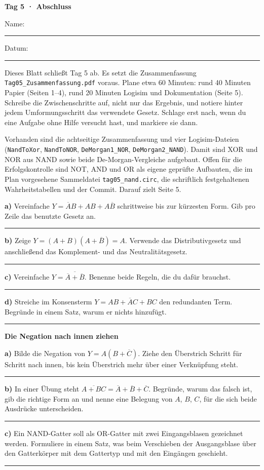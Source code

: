 \documentclass[10pt,a4paper]{article}
\newcommand{\titlepagepart}[2]{\vspace*{-4mm}{\sffamily\small #1}\par{\sffamily\LARGE\bfseries #2}\par\vspace{2mm}}
\newcommand{\block}[1]{\par\vspace{2mm}{\sffamily\large\bfseries #1}\par}
\newcommand{\code}[1]{\texttt{#1}}
\newcommand{\antwort}[1]{\par\vspace{#1}\hrule\vspace{3mm}}
\begin{document}
\titlepagepart{01 / BOOLESCHE ALGEBRA · CA. 12 MINUTEN}{Tag 5 · Abschluss}
Name: \rule{65mm}{0.3pt}\hfill Datum: \rule{30mm}{0.3pt}

Dieses Blatt schließt Tag 5 ab. Es setzt die Zusammenfassung
\code{Tag05\_Zusammenfassung.pdf} voraus. Plane etwa 60 Minuten: rund
40 Minuten Papier (Seiten 1--4), rund 20 Minuten Logisim und Dokumentation
(Seite 5). Schreibe die Zwischenschritte auf, nicht nur das Ergebnis, und
notiere hinter jedem Umformungsschritt das verwendete Gesetz. Schlage erst
nach, wenn du eine Aufgabe ohne Hilfe versucht hast, und markiere sie dann.

\block{Stand im Ordner \code{01\_digital/02\_logikgatter/tag05}}
Vorhanden sind die achtseitige Zusammenfassung und vier Logisim-Dateien
(\code{NandToXor}, \code{NandToNOR}, \code{DeMorgan1\_NOR},
\code{DeMorgan2\_NAND}). Damit sind XOR und NOR aus NAND sowie beide
De-Morgan-Vergleiche aufgebaut. Offen für die Erfolgskontrolle sind NOT, AND
und OR als eigene geprüfte Aufbauten, die im Plan vorgesehene Sammeldatei
\code{tag05\_nand.circ}, die schriftlich festgehaltenen Wahrheitstabellen und
der Commit. Darauf zielt Seite 5.

\block{1. Vereinfachen mit den Gesetzen}
\textbf{a)} Vereinfache $Y=\overline{A}B+AB+A\overline{B}$ schrittweise bis zur
kürzesten Form. Gib pro Zeile das benutzte Gesetz an.
\antwort{26mm}
\textbf{b)} Zeige $Y=(A+B)(A+\overline{B})=A$. Verwende das Distributivgesetz
und anschließend das Komplement- und das Neutralitätsgesetz.
\antwort{24mm}
\textbf{c)} Vereinfache $Y=\overline{\overline{A}+\overline{B}}$. Benenne beide
Regeln, die du dafür brauchst.
\antwort{20mm}
\textbf{d)} Streiche im Konsensterm $Y=AB+\overline{A}C+BC$ den redundanten
Term. Begründe in einem Satz, warum er nichts hinzufügt.
\antwort{24mm}

\newpage
\titlepagepart{02 / DE MORGAN · CA. 12 MINUTEN}{Die Negation nach innen ziehen}

\block{2. De Morgan sicher anwenden}
\textbf{a)} Bilde die Negation von $Y=A(B+\overline{C})$. Ziehe den Überstrich
Schritt für Schritt nach innen, bis kein Überstrich mehr über einer
Verknüpfung steht.
\antwort{26mm}
\textbf{b)} In einer Übung steht $\overline{A+BC}=\overline{A}+\overline{B}+\overline{C}$.
Begründe, warum das falsch ist, gib die richtige Form an und nenne eine
Belegung von $A$, $B$, $C$, für die sich beide Ausdrücke unterscheiden.
\antwort{30mm}
\textbf{c)} Ein NAND-Gatter soll als OR-Gatter mit zwei Eingangsblasen
gezeichnet werden. Formuliere in einem Satz, was beim Verschieben der
Ausgangsblase über den Gatterkörper mit dem Gattertyp und mit den Eingängen
geschieht.
\antwort{20mm}
\end{document}

